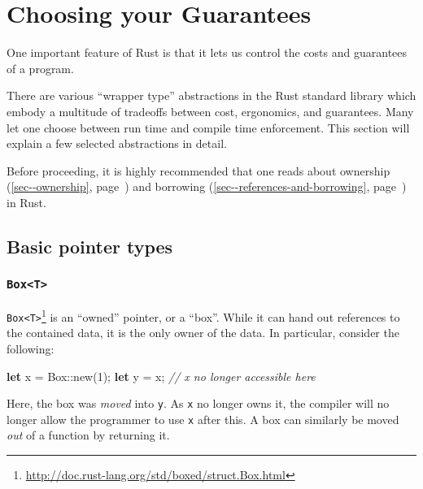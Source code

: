 \documentclass[a4paper,]{book}
\renewcommand*{\hypertarget}[3][\ar]{%
  \def\ar{#2}%
  \label{#1}%
  #3}
\renewcommand*{\hyperlink}[2]{%
 #2 (\autoref{#1}, page~\pageref{#1})}
\newenvironment{Shaded}{\begin{snugshade}}{\end{snugshade}}
\newcommand{\KeywordTok}[1]{\textcolor[rgb]{0.13,0.29,0.53}{\textbf{{#1}}}}
\newcommand{\DataTypeTok}[1]{\textcolor[rgb]{0.13,0.29,0.53}{{#1}}}
\newcommand{\DecValTok}[1]{\textcolor[rgb]{0.00,0.00,0.81}{{#1}}}
\newcommand{\CommentTok}[1]{\textcolor[rgb]{0.56,0.35,0.01}{\textit{{#1}}}}
\newcommand{\NormalTok}[1]{{#1}}
\renewcommand{\href}[2]{#2\footnote{\url{#1}}}
\begin{document}
\hypertarget{sec--choosing-your-guarantees}{\section{Choosing your
Guarantees}\label{sec--choosing-your-guarantees}}

One important feature of Rust is that it lets us control the costs and
guarantees of a program.

There are various ``wrapper type'' abstractions in the Rust standard
library which embody a multitude of tradeoffs between cost, ergonomics,
and guarantees. Many let one choose between run time and compile time
enforcement. This section will explain a few selected abstractions in
detail.

Before proceeding, it is highly recommended that one reads about
\protect\hyperlink{sec--ownership}{ownership} and
\protect\hyperlink{sec--references-and-borrowing}{borrowing} in Rust.

\subsection{Basic pointer types}\label{basic-pointer-types}

\subsubsection{\texorpdfstring{\texttt{Box\textless{}T\textgreater{}}}{Box\textless{}T\textgreater{}}}\label{boxt}

\href{http://doc.rust-lang.org/std/boxed/struct.Box.html}{\texttt{Box\textless{}T\textgreater{}}}
is an ``owned'' pointer, or a ``box''. While it can hand out references
to the contained data, it is the only owner of the data. In particular,
consider the following:

\begin{Shaded}
\begin{Highlighting}[]
\KeywordTok{let} \NormalTok{x = }\DataTypeTok{Box}\NormalTok{::new(}\DecValTok{1}\NormalTok{);}
\KeywordTok{let} \NormalTok{y = x;}
\CommentTok{// x no longer accessible here}
\end{Highlighting}
\end{Shaded}

Here, the box was \emph{moved} into \texttt{y}. As \texttt{x} no longer
owns it, the compiler will no longer allow the programmer to use
\texttt{x} after this. A box can similarly be moved \emph{out} of a
function by returning it.
\end{document}
